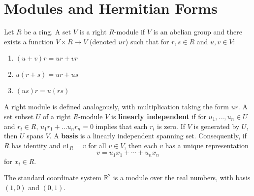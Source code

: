 \documentclass[11pt]{article}
\begin{document}
\section*{Modules and Hermitian Forms}
\begin{definition*}
Let $R$ be a ring.
A set $V$ is a right $R$-module if $V$ is an abelian group and there exists a function $V \times R \to V$
(denoted $ur$) such that for $r, s \in R$ and $u, v \in V$:
\begin{enumerate}
\item $(u + v)r = ur + vr$
\item $u(r + s) = ur + us$
\item $(us)r = u(rs)$
\end{enumerate}
A right module is defined analogously, with multiplication taking the form $ur$.
A set subset $U$ of a right $R$-module $V$ is \textbf{linearly independent} if for $u_1, \dotsc, u_n \in U$ and $r_i \in R$,
$u_1 r_1 + \dotsc u_n r_n = 0$ implies that each $r_i$ is zero.
If $V$ is generated by $U$, then $U$ spans $V$.
A \textbf{basis} is a linearly independent spanning set.
Consequently, if $R$ has identity and $v 1_R = v$ for all $v \in V$, then each $v$ has a unique representation
\[
v = u_1 x_1 + \dotsb + u_n x_n
\]
for $x_i \in R$.
\end{definition*}

\begin{example*}
The standard coordinate system $\mathbb{R}^2$ is a module over the real numbers, with basis $(1, 0)$ and $(0, 1)$.
\end{example*}
\end{document}
